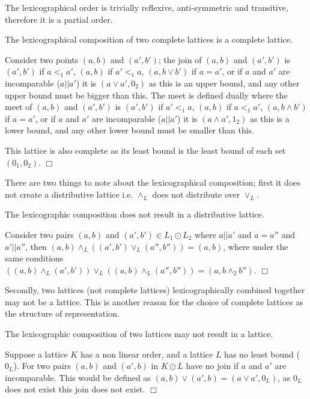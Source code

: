 The lexicographical order is trivially reflexive, anti-symmetric and transitive, therefore it is a partial order.
\begin{prop}
The lexicographical composition of two complete lattices is a complete lattice.
\end{prop}
\begin{prof}
Consider two points $(a,b)$ and $(a',b')$; 
the join of $(a,b)$ and $(a',b')$ is $(a',b')$ if $a <_1 a'$,
$(a,b)$ if $a' <_1 a$,
$(a, b \vee b')$ if $a = a'$,
or if $a$ and $a'$ are incomparable ($a||a'$) it is $(a \vee a', 0_2)$
as this is an upper bound, and any other upper bound must be bigger than this.
The meet is defined dually where the meet of $(a,b)$ and $(a',b')$ is $(a',b')$ if $a' <_1 a$,
$(a,b)$ if $a <_1 a'$,
$(a, b \wedge b')$ if $a = a'$,
or if $a$ and $a'$ are incomparable ($a||a'$) it is $(a \wedge a',1_2)$
as this is a lower bound, and any other lower bound must be smaller than this.

This lattice is also complete as its least bound is the least bound of each set $(0_1,0_2)$.
$\Box$\end{prof}

There are two things to note about the lexicographical composition; 
first it does not create a distributive lattice i.e. $\wedge_L$ does not distribute over $\vee_L$.
\begin{prop}
The lexicographic composition does not result in a distributive lattice.
\end{prop}
\begin{prof}
Consider two pairs $(a,b)$ and $(a', b') \in L_1 \odot L_2$ where $a || a'$ and $a = a''$ and $a' || a''$,
then $(a,b) \wedge_{L} ((a', b') \vee_{L} (a'', b'')) = (a,b)$,
where under the same conditions $((a,b) \wedge_{L} (a', b')) \vee_{L} ((a,b) \wedge_{L} (a'', b'')) = (a,b \wedge_2 b'')$.
$\Box$\end{prof}

Secondly, two lattices (not complete lattices) lexicographically combined together may not be a lattice. 
This is another reason for the choice of complete lattices as the structure of representation.
\begin{prop}
The lexicographic composition of two lattices may not result in a lattice.
\end{prop}
\begin{prof}
Suppose a lattice $K$ has a non linear order, and a lattice $L$ has no least bound ($0_L$). 
For two pairs $(a,b)$ and $(a',b)$ in $K \odot L$ have no join if $a$ and $a'$ are incomparable.
This would be defined as $(a,b) \vee (a',b) = (a \vee a',0_L)$, as $0_L$ does not exist this join does not exist.
$\Box$\end{prof}

